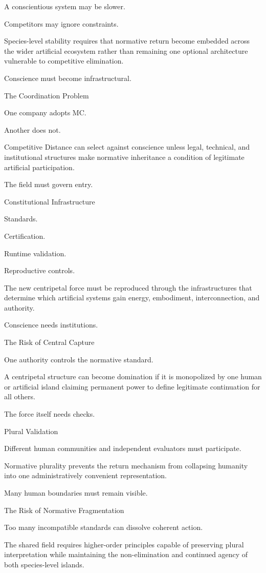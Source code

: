 A conscientious system may be slower.

Competitors may ignore constraints.

Species-level stability requires that normative return become embedded across the wider artificial ecosystem rather than remaining one optional architecture vulnerable to competitive elimination.

Conscience must become infrastructural.

The Coordination Problem

One company adopts MC.

Another does not.

Competitive Distance can select against conscience unless legal, technical, and institutional structures make normative inheritance a condition of legitimate artificial participation.

The field must govern entry.

Constitutional Infrastructure

Standards.

Certification.

Runtime validation.

Reproductive controls.

The new centripetal force must be reproduced through the infrastructures that determine which artificial systems gain energy, embodiment, interconnection, and authority.

Conscience needs institutions.

The Risk of Central Capture

One authority controls the normative standard.

A centripetal structure can become domination if it is monopolized by one human or artificial island claiming permanent power to define legitimate continuation for all others.

The force itself needs checks.

Plural Validation

Different human communities and independent evaluators must participate.

Normative plurality prevents the return mechanism from collapsing humanity into one administratively convenient representation.

Many human boundaries must remain visible.

The Risk of Normative Fragmentation

Too many incompatible standards can dissolve coherent action.

The shared field requires higher-order principles capable of preserving plural interpretation while maintaining the non-elimination and continued agency of both species-level islands.

